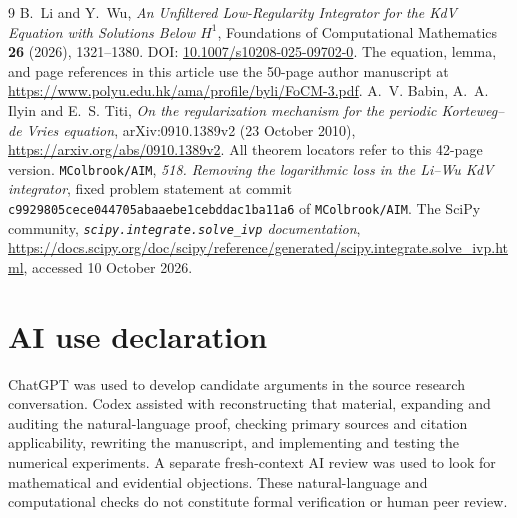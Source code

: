 \documentclass[11pt]{article}
\theoremstyle{remark}\newtheorem{remark}[theorem]{Remark}
\begin{document}
\clearpage
\begin{thebibliography}{9}
B.~Li and Y.~Wu,
\emph{An Unfiltered Low-Regularity Integrator for the KdV Equation with Solutions Below $H^1$},
Foundations of Computational Mathematics \textbf{26} (2026), 1321--1380.
DOI: \href{https://doi.org/10.1007/s10208-025-09702-0}{10.1007/s10208-025-09702-0}.
The equation, lemma, and page references in this article use the 50-page author
manuscript at \url{https://www.polyu.edu.hk/ama/profile/byli/FoCM-3.pdf}.
A.~V. Babin, A.~A. Ilyin and E.~S. Titi,
\emph{On the regularization mechanism for the periodic Korteweg--de Vries equation},
arXiv:0910.1389v2 (23 October 2010), \url{https://arxiv.org/abs/0910.1389v2}.
All theorem locators refer to this 42-page version.
\texttt{MColbrook/AIM}, \emph{518. Removing the logarithmic loss in the Li--Wu KdV integrator},
fixed problem statement at commit
\texttt{c9929805cece044705abaaebe1cebddac1ba11a6} of \texttt{MColbrook/AIM}.
The SciPy community, \emph{\texttt{scipy.integrate.solve\_ivp} documentation},
\url{https://docs.scipy.org/doc/scipy/reference/generated/scipy.integrate.solve_ivp.html},
accessed 10 October 2026.
\end{thebibliography}

\section*{AI use declaration}
ChatGPT was used to develop candidate arguments in the source research
conversation. Codex assisted with reconstructing that material, expanding
and auditing the natural-language proof, checking primary sources and
citation applicability, rewriting the manuscript, and implementing and
testing the numerical experiments. A separate fresh-context AI review
was used to look for mathematical and evidential objections. These
natural-language and computational checks do not constitute formal
verification or human peer review.
\end{document}
